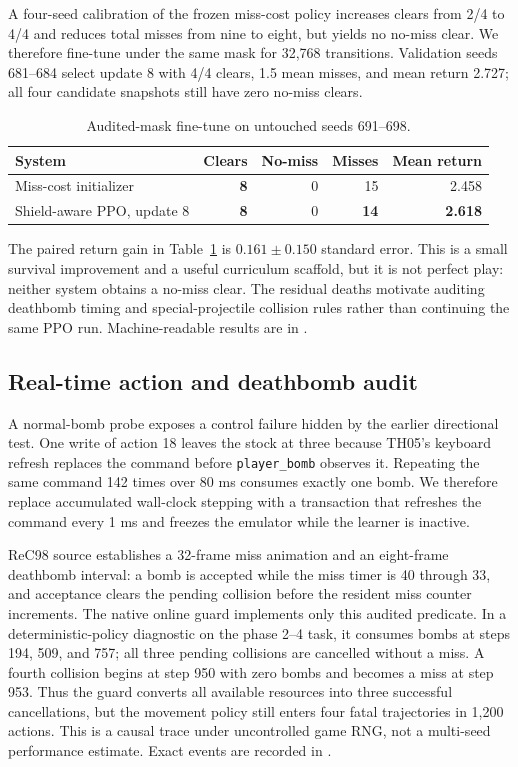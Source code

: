 \documentclass[10pt]{article}
\begin{document}
A four-seed calibration of the frozen miss-cost policy increases clears from
2/4 to 4/4 and reduces total misses from nine to eight, but yields no no-miss
clear.  We therefore fine-tune under the same mask for 32,768 transitions.
Validation seeds 681--684 select update 8 with 4/4 clears, 1.5 mean misses, and
mean return 2.727; all four candidate snapshots still have zero no-miss clears.

\begin{table}[ht]
  \centering
  \caption{Audited-mask fine-tune on untouched seeds 691--698.}
  \label{tab:audited-mask}
  \begin{tabular}{lrrrr}
    \toprule
    System & Clears & No-miss & Misses & Mean return \\
    \midrule
    Miss-cost initializer & \textbf{8} & 0 & 15 & 2.458 \\
    Shield-aware PPO, update 8 & \textbf{8} & 0 & \textbf{14} & \textbf{2.618} \\
    \bottomrule
  \end{tabular}
\end{table}

The paired return gain in Table~\ref{tab:audited-mask} is
$0.161\pm0.150$ standard error.  This is a small survival improvement and a
useful curriculum scaffold, but it is not perfect play: neither system obtains
a no-miss clear.  The residual deaths motivate auditing deathbomb timing and
special-projectile collision rules rather than continuing the same PPO run.
Machine-readable results are in
.

\subsection{Real-time action and deathbomb audit}

A normal-bomb probe exposes a control failure hidden by the earlier directional
test.  One write of action 18 leaves the stock at three because TH05's keyboard
refresh replaces the command before \texttt{player\_bomb} observes it.  Repeating
the same command 142 times over 80 ms consumes exactly one bomb.  We therefore
replace accumulated wall-clock stepping with a transaction that refreshes the
command every 1 ms and freezes the emulator while the learner is inactive.

ReC98 source establishes a 32-frame miss animation and an eight-frame
deathbomb interval: a bomb is accepted while the miss timer is 40 through 33,
and acceptance clears the pending collision before the resident miss counter
increments.  The native online guard implements only this audited predicate.
In a deterministic-policy diagnostic on the phase 2--4 task, it consumes bombs
at steps 194, 509, and 757; all three pending collisions are cancelled without
a miss.  A fourth collision begins at step 950 with zero bombs and becomes a
miss at step 953.  Thus the guard converts all available resources into three
successful cancellations, but the movement policy still enters four fatal
trajectories in 1,200 actions.  This is a causal trace under uncontrolled game
RNG, not a multi-seed performance estimate.  Exact events are recorded in
.
\end{document}
